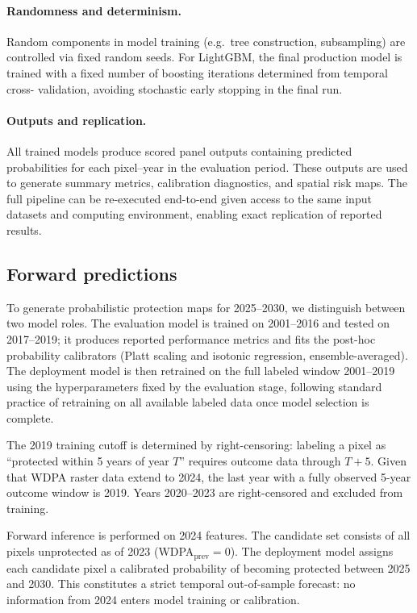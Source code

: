 \documentclass[12pt]{article}
\theoremstyle{break} %
\begin{document}
\paragraph{Randomness and determinism.}
Random components in model training (e.g.\ tree construction, subsampling) are controlled via fixed random seeds. For LightGBM, the final production model is trained with a fixed number of boosting iterations determined from temporal cross- validation, avoiding stochastic early stopping in the final run.

\paragraph{Outputs and replication.}
All trained models produce scored panel outputs containing predicted probabilities for each pixel--year in the evaluation period. These outputs are used to generate summary metrics, calibration diagnostics, and spatial risk maps. The full pipeline can be re-executed end-to-end given access to the same input datasets and computing environment, enabling exact replication of reported results.

\subsection{Forward predictions}
\label{forward}
To generate probabilistic protection maps for 2025--2030, we distinguish between two model roles. The evaluation model is trained on 2001--2016 and tested on 2017--2019; it produces reported performance metrics and fits the post-hoc probability calibrators (Platt scaling and isotonic regression, ensemble-averaged). The deployment model is then retrained on the full labeled window 2001--2019 using the hyperparameters fixed by the evaluation stage, following standard practice of retraining on all available labeled data once model selection is complete.

The 2019 training cutoff is determined by right-censoring: labeling a pixel as ``protected within 5 years of year $T$'' requires outcome data through $T+5$. Given that WDPA raster data extend to 2024, the last year with a fully observed 5-year outcome window is 2019. Years 2020--2023 are right-censored and excluded from training.

Forward inference is performed on 2024 features. The candidate set consists of all pixels unprotected as of 2023 (WDPA$_{\text{prev}} = 0$). The deployment model assigns each candidate pixel a calibrated probability of becoming protected between 2025 and 2030. This constitutes a strict temporal out-of-sample forecast: no information from 2024 enters model training or calibration.
\end{document}
